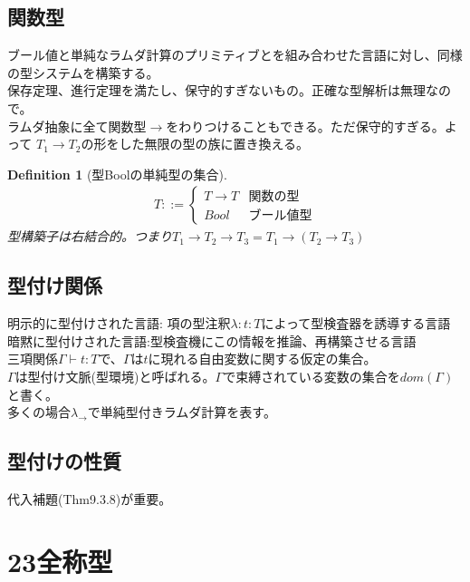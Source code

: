 \documentclass[a4paper,10pt]{article}
\newtheorem{definition}{Definition}[section]
\begin{document}
\subsection*{関数型}
ブール値と単純なラムダ計算のプリミティブとを組み合わせた言語に対し、同様の型システムを構築する。\\
保存定理、進行定理を満たし、保守的すぎないもの。正確な型解析は無理なので。\\
ラムダ抽象に全て関数型$\rightarrow$をわりつけることもできる。ただ保守的すぎる。よって
$T_1 \rightarrow T_2$の形をした無限の型の族に置き換える。
\begin{definition}[型Boolの単純型の集合]
\begin{align*}
T::=
\begin{cases}
T \rightarrow T & \text{関数の型}\\
Bool & \text{ブール値型}
\end{cases}
\end{align*}
型構築子は右結合的。つまり$T_1 \rightarrow T_2 \rightarrow T_3=T_1 \rightarrow (T_2 \rightarrow T_3)$
\end{definition}
\subsection*{型付け関係}
明示的に型付けされた言語: 項の型注釈$\lambda:t:T$によって型検査器を誘導する言語\\
暗黙に型付けされた言語:型検査機にこの情報を推論、再構築させる言語\\
三項関係$\Gamma \vdash t:T$で、$\Gamma$は$t$に現れる自由変数に関する仮定の集合。\\
$\Gamma$は型付け文脈(型環境)と呼ばれる。$\Gamma$で束縛されている変数の集合を$dom(\Gamma)$
と書く。\\
多くの場合$\lambda_{\rightarrow}$で単純型付きラムダ計算を表す。
\subsection*{型付けの性質}
代入補題(Thm9.3.8)が重要。
\section*{23全称型}
\end{document}
